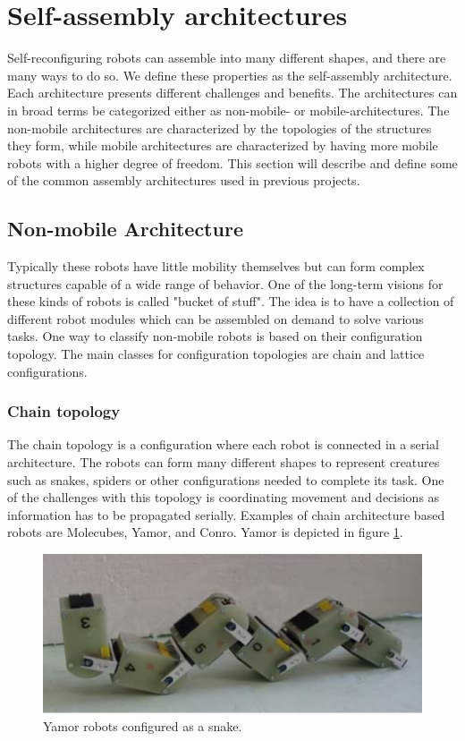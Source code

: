 \section{Self-assembly architectures}
\label{sec:sfArchitecture}
Self-reconfiguring robots can assemble into many different shapes, and there are many ways to do so.
We define these properties as the self-assembly architecture.
Each architecture presents different challenges and benefits.
The architectures can in broad terms be categorized either as non-mobile- or mobile-architectures.
The non-mobile architectures are characterized by the topologies of the structures they form, while mobile architectures are characterized by having more mobile robots with a higher degree of freedom.
This section will describe and define some of the common assembly architectures used in previous projects.
\subsection{Non-mobile Architecture}
Typically these robots have little mobility themselves but can form complex structures capable of a wide range of behavior.
One of the long-term visions for these kinds of robots is called "bucket of stuff"\cite{yim_modular_2007}.
The idea is to have a collection of different robot modules which can be assembled on demand to solve various tasks.
One way to classify non-mobile robots is based on their configuration topology.
The main classes for configuration topologies are chain and lattice configurations.

\subsubsection{Chain topology}
The chain topology is a configuration where each robot is connected in a serial architecture.
The robots can form many different shapes to represent creatures such as snakes, spiders or other configurations needed to complete its task.
One of the challenges with this topology is coordinating movement and decisions as information has to be propagated serially.
Examples of chain architecture based robots are Molecubes\cite{zykov_molecubes:_2007}, Yamor\cite{mockel_yamor_2006}, and Conro\cite{castano_conro:_2000}.
Yamor is depicted in figure \ref{fig:yamor}.

\begin{figure}[H]    
	\centering
	\includegraphics[scale=0.5]{chapters/res/Yamor.PNG}
	\caption{Yamor robots configured as a snake\cite{mockel_yamor_2006}.}
	\label{fig:yamor}
\end{figure}

